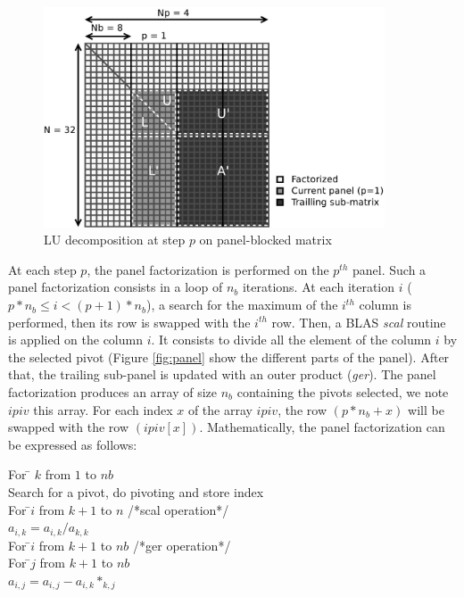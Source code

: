 \begin{figure}[!ht]
\centering
\includegraphics[width=0.9\textwidth]{figures/panel_matrix_bw.pdf}
\caption{LU decomposition at step $p$ on panel-blocked matrix \label{fig:matrix}}
\end{figure}

 
At each step $p$, the panel factorization is performed on the $p^{th}$ panel. Such a panel factorization consists in a loop of $n_b$ iterations. At each iteration $i$ ($p*n_b \leq i < (p+1)*n_b$), a search for the maximum of the $i^{th}$ column is performed, then its row is swapped with the $i^{th}$ row.
Then, a BLAS \textit{scal} routine is applied on the column $i$. It consists to divide all the element of the column $i$ by the selected pivot (Figure \ref{fig:panel} show the different parts of the panel).
After that, the trailing sub-panel is updated with an outer product (\textit{ger}). The panel factorization produces an array of size $n_b$ containing the pivots selected, we note $ipiv$ this array. For each index $x$ of the array $ipiv$, the row $(p*n_b + x)$ will be swapped with the row $(ipiv[x])$.
Mathematically, the panel factorization can be expressed as follows:\\
\begin{tabbing}
For \= $k$ from $1$ to $nb$\\
\> Search for a pivot, do pivoting and store index\\
\> For \=$i$ from $k+1$ to $n$    /*scal operation*/\\
\>\> $a_{i,k} = a_{i,k}/a_{k,k}$\\
\> For \=$i$ from $k+1$ to $nb$   /*ger operation*/\\
\>\> For \=$j$ from $k+1$ to $nb$\\
\>\>\> $a_{i,j} = a_{i,j}-a_{i,k}*_{k,j}$\\
\end{tabbing}

